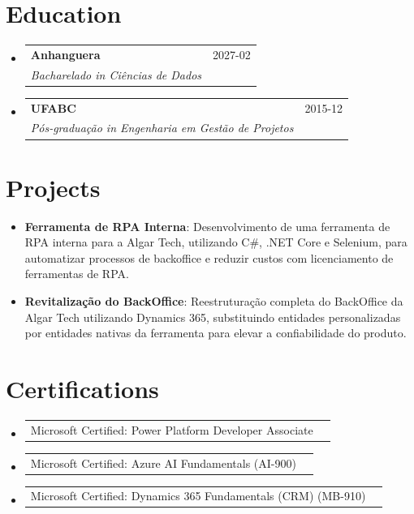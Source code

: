 \documentclass[a4paper,11pt]{article}
\makeatletter
\newcommand{\resumeItem}[1]{
  \item\small{
    {#1 \vspace{-2pt}}
  }
}
\newcommand{\resumeSubheading}[4]{
  \vspace{-1pt}\item
  \begin{tabular*}{0.97\textwidth}{l@{\extracolsep{\fill}}r}
    \textbf{#1} & #2 \\
    \textit{\small#3} & \textit{\small #4} \\
  \end{tabular*}\vspace{-5pt}
}
\newcommand{\resumeCertification}[2]{%
  \item
  \begin{tabular*}{0.97\textwidth}{@{}l@{\extracolsep{\fill}}r@{}}
    #1 & \text{#2} \\
  \end{tabular*}\vspace{-4pt}
}
\newcommand{\resumeSubItem}[2]{\resumeItem{#1: #2}\vspace{-4pt}}
\newcommand{\resumeSubHeadingListStart}{\begin{itemize}[leftmargin=0em, itemindent=0em, label={}, itemsep=0ex]}
\newcommand{\resumeSubHeadingListEnd}{\end{itemize}}
\makeatother
\begin{document}
\section{Education}
\resumeSubHeadingListStart

\resumeSubheading
{Anhanguera}{2027-02}
{Bacharelado in Ciências de Dados}{}

\resumeSubheading
{UFABC}{2015-12}
{Pós-graduação in Engenharia em Gestão de Projetos}{}
\resumeSubHeadingListEnd

\section{Projects}
\resumeSubHeadingListStart
\resumeSubItem{\textbf{Ferramenta de RPA Interna}}{Desenvolvimento de uma ferramenta de RPA interna para a Algar Tech, utilizando C\#, .NET Core e Selenium, para automatizar processos de backoffice e reduzir custos com licenciamento de ferramentas de RPA.}
\resumeSubItem{\textbf{Revitalização do BackOffice}}{Reestruturação completa do BackOffice da Algar Tech utilizando Dynamics 365, substituindo entidades personalizadas por entidades nativas da ferramenta para elevar a confiabilidade do produto.}
\resumeSubHeadingListEnd

\section{Certifications}
\resumeSubHeadingListStart
\resumeCertification{Microsoft Certified: Power Platform Developer Associate}{2025-12}{}{}
\resumeCertification{Microsoft Certified: Azure AI Fundamentals (AI-900)}{2025-12}{}{}
\resumeCertification{Microsoft Certified: Dynamics 365 Fundamentals (CRM) (MB-910)}{2023-12}{}{}
\resumeSubHeadingListEnd
\end{document}
